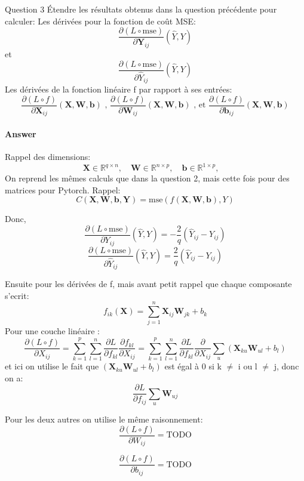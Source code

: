 \documentclass[12pt,a4paper]{article}
\begin{document}
\begin{section}{Question 3}
Étendre les résultats obtenus dans la question précédente pour calculer: \newline
Les dérivées pour la fonction de coût MSE:
\[
\frac{\partial (L\circ \text{mse})}{\partial \mathbf{Y}_{ij}}(\hat{Y}, Y)
\]
et
\[\frac{\partial (L\circ \text{mse})}{\partial \hat{Y}_{ij}}(\hat{Y}, Y)\]
Les dérivées de la fonction linéaire f par rapport à ses entrées:
\[
\frac{\partial (L\circ f)}{\partial \mathbf{X}_{ij}}(\mathbf{X}, \mathbf{W}, \mathbf{b}) \text{ , }
\frac{\partial (L\circ f)}{\partial \mathbf{W}_{ij}}(\mathbf{X}, \mathbf{W}, \mathbf{b}) \text{ , et }
\frac{\partial (L\circ f)}{\partial \mathbf{b}_{ij}}(\mathbf{X}, \mathbf{W}, \mathbf{b})
\]

\paragraph{Answer}
Rappel des dimensions: 
\[
\mathbf{X} \in \mathbb{R}^{q \times n}, \quad
\mathbf{W} \in \mathbb{R}^{n \times p}, \quad
\mathbf{b} \in \mathbb{R}^{1 \times p}, \quad
\]
On reprend les mêmes calculs que dans la question 2, mais cette fois pour des matrices pour Pytorch.
Rappel:
\[
C(\mathbf{X}, \mathbf{W}, \mathbf{b}, \mathbf{Y}) = \text{mse}(f(\mathbf{X}, \mathbf{W}, \mathbf{b}), Y)
\]

Donc,
\[
\frac{\partial (L \circ \text{mse})}{\partial Y_{ij}}(\hat{Y}, Y) = -\frac{2}{q} (\hat{Y}_{ij} - Y_{ij})
\] 
\[
\frac{\partial (L \circ \text{mse})}{\partial \hat{Y}_{ij}}(\hat{Y}, Y) = \frac{2}{q} (\hat{Y}_{ij} - Y_{ij})
\] 

Ensuite pour les dérivées de f, mais avant petit rappel que chaque composante s'ecrit:
\[
f_{ik}(\mathbf{X}) = \sum_{j=1}^{n} \mathbf{X}_{ij} \mathbf{W}_{jk} + b_k
\]
Pour une couche linéaire :  
\[
\frac{\partial (L\circ f)}{\partial X_{ij}} = \sum_{k=1}^{p} \sum_{l=1}^{n} \frac{\partial L}{\partial f_{kl}} \frac{\partial f_{kl}}{\partial X_{ij}} = 
\sum_{k=1}^{p} \sum_{l=1}^{n} \frac{\partial L}{\partial f_{kl}} \frac{\partial}{\partial X_{ij}} \sum_{u} \left(\mathbf{X}_{ku} \mathbf{W}_{ul} + b_l \right)
\]
et ici on utilise le fait que $\left(\mathbf{X}_{ku} \mathbf{W}_{ul} + b_l \right)$ est égal à 0 si k $\neq$ i ou l $\neq$ j, donc on a:
\[
\frac{\partial L}{\partial f_{ij}} \sum_u \mathbf{W}_{uj}
\]

Pour les deux autres on utilise le même raisonnement:
\[
\frac{\partial (L\circ f)}{\partial W_{ij}} = \text{TODO}
\]

\[
\frac{\partial (L\circ f)}{\partial b_{ij}} = \text{TODO}
\]


\end{section}
\end{document}
